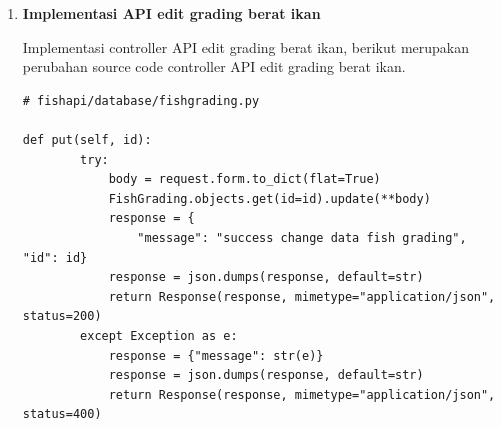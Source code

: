 \begin{enumerate}[1.]
\begin{lstlisting}
[
  {
    "_id": "62e105307ac8f837667faa6f",
    "pond_id": "62a62163e445ffb9c5f746f3",
    "pond_activation_id": "62d3f2180d7265ab60f9cb83",
    "fish_type": "lele",
    "sampling_amount": 10,
    "avg_fish_weight": 50,
    "avg_fish_long": 10,
    "amount_normal_fish": 8,
    "amount_oversize_fish": 1,
    "amount_undersize_fish": 1,
    "pond": {
      "_id": "62a62163e445ffb9c5f746f3",
      "alias": "charlie",
      "location": "blok 2",
      "build_at": "2022-06-13 00:24:51.473000",
      "isActive": true
    },
    "pond_activation": {
      "_id": "62d3f2180d7265ab60f9cb83",
      "isFinish": false,
      "isWaterPreparation": true,
      "water_level": 100,
      "activated_at": "2022-07-17 18:27:20.511000"
    }
  },
  {
    "_id": "62e105707ac8f837667faa70",
    "pond_id": "62a62163e445ffb9c5f746f3",
    "pond_activation_id": "62d3f2180d7265ab60f9cb83",
    "fish_type": "lele",
    "sampling_amount": 20,
    "avg_fish_weight": 50,
    "avg_fish_long": 10,
    "amount_normal_fish": 18,
    "amount_oversize_fish": 1,
    "amount_undersize_fish": 1,
    "pond": {
      "_id": "62a62163e445ffb9c5f746f3",
      "alias": "charlie",
      "location": "blok 2",
      "build_at": "2022-06-13 00:24:51.473000",
      "isActive": true
    },
    "pond_activation": {
      "_id": "62d3f2180d7265ab60f9cb83",
      "isFinish": false,
      "isWaterPreparation": true,
      "water_level": 100,
      "activated_at": "2022-07-17 18:27:20.511000"
    }
  }
]
\end{lstlisting}



\item \textbf{Implementasi API edit grading berat ikan}

Implementasi controller API edit grading berat ikan, berikut merupakan perubahan source code controller API edit grading berat ikan.

\begin{lstlisting}
# fishapi/database/fishgrading.py

def put(self, id):
        try:
            body = request.form.to_dict(flat=True)
            FishGrading.objects.get(id=id).update(**body)
            response = {
                "message": "success change data fish grading", "id": id}
            response = json.dumps(response, default=str)
            return Response(response, mimetype="application/json", status=200)
        except Exception as e:
            response = {"message": str(e)}
            response = json.dumps(response, default=str)
            return Response(response, mimetype="application/json", status=400)
\end{lstlisting}


\end{enumerate}
